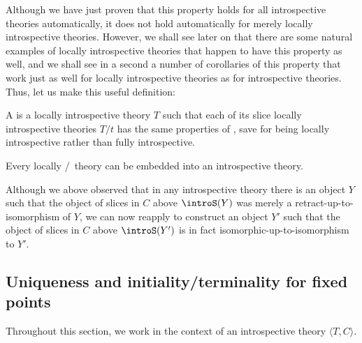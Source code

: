 Although we have just proven that this property holds for all introspective theories automatically, it does not hold automatically for merely locally introspective theories. However, we shall see later on that there are some natural examples of locally introspective theories that happen to have this property as well, and we shall see in a second a number of corollaries of this property that work just as well for locally introspective theories as for introspective theories. Thus, let us make this useful definition:

\begin{definition}
A  is a locally introspective theory $T$ such that each of its slice locally introspective theories $T/t$ has the same properties of , save for being locally introspective rather than fully introspective.
\end{definition}

\begin{conjecture}
Every locally \Loeb/\ theory can be embedded into an introspective theory.
\end{conjecture}

\begin{observation}
Although we above observed that in any introspective theory there is an object $Y$ such that the object of slices in $C$ above $\introS(Y)$ was merely a retract-up-to-isomorphism of $Y$, we can now reapply  to construct an object $Y'$ such that the object of slices in $C$ above $\introS(Y')$ is in fact isomorphic-up-to-isomorphism to $Y'$. 
\end{observation}

\subsection{Uniqueness and initiality/terminality for fixed points}
Throughout this section, we work in the context of an introspective theory $\langle T, C \rangle$. 

